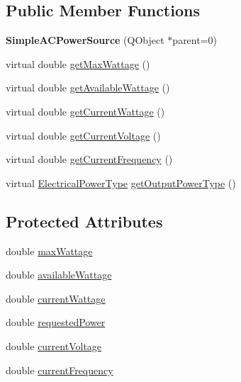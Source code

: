 \subsection*{Public Member Functions}
\begin{DoxyCompactItemize}
\item 
\hypertarget{class_challenger604_systems_1_1_simple_a_c_power_source_afb2f7b55ab007667b09d338c17f477ed}{{\bfseries Simple\-A\-C\-Power\-Source} (Q\-Object $\ast$parent=0)}\label{class_challenger604_systems_1_1_simple_a_c_power_source_afb2f7b55ab007667b09d338c17f477ed}

\item 
virtual double \hyperlink{class_challenger604_systems_1_1_simple_a_c_power_source_ae330676157035c37441d3c8bfc198c2e}{get\-Max\-Wattage} ()
\item 
virtual double \hyperlink{class_challenger604_systems_1_1_simple_a_c_power_source_ac20e3e1da3458450951998370cd57601}{get\-Available\-Wattage} ()
\item 
virtual double \hyperlink{class_challenger604_systems_1_1_simple_a_c_power_source_a151696a75ded62c4df93b8597a5a0c2a}{get\-Current\-Wattage} ()
\item 
virtual double \hyperlink{class_challenger604_systems_1_1_simple_a_c_power_source_a04f64b1611005171ebb491b84508bcc7}{get\-Current\-Voltage} ()
\item 
virtual double \hyperlink{class_challenger604_systems_1_1_simple_a_c_power_source_ad125522705327fe9e78234c70e1e444f}{get\-Current\-Frequency} ()
\item 
virtual \hyperlink{namespace_challenger604_systems_a9ad1a793d94b97514092692cb7315afd}{Electrical\-Power\-Type} \hyperlink{class_challenger604_systems_1_1_simple_a_c_power_source_aaaebd8199288938f6d7955743669193b}{get\-Output\-Power\-Type} ()
\end{DoxyCompactItemize}
\subsection*{Protected Attributes}
\begin{DoxyCompactItemize}
\item 
double \hyperlink{class_challenger604_systems_1_1_simple_a_c_power_source_a52f945e3cf2a2ece8a3d9f772d5cddce}{max\-Wattage}
\item 
double \hyperlink{class_challenger604_systems_1_1_simple_a_c_power_source_af9aab8bb1f32a240aba9b6c4ac969ba9}{available\-Wattage}
\item 
double \hyperlink{class_challenger604_systems_1_1_simple_a_c_power_source_a555e44c4500e6f094e9fb7ca17939648}{current\-Wattage}
\item 
double \hyperlink{class_challenger604_systems_1_1_simple_a_c_power_source_aeae97501266decbd321fe2a934d5f225}{requested\-Power}
\item 
double \hyperlink{class_challenger604_systems_1_1_simple_a_c_power_source_a10506cd4ead6a716f150baaaa4c56888}{current\-Voltage}
\item 
double \hyperlink{class_challenger604_systems_1_1_simple_a_c_power_source_a321cb77fea6e9d7a79fd69d2bd7a7227}{current\-Frequency}
\end{DoxyCompactItemize}


